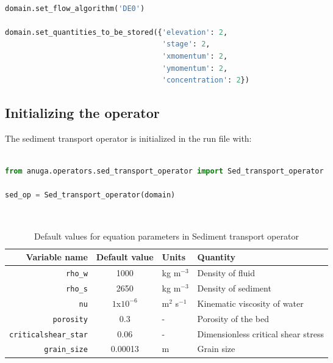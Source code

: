 \documentclass[10pt]{article}
\newcommand{\ra}[1]{\renewcommand{\arraystretch}{#1}}
\begin{document}
\begin{minipage}[c]{0.95\textwidth}
\begin{lstlisting}[language=Python, title=Setting the flow algorithm and recording the output]

domain.set_flow_algorithm('DE0')

domain.set_quantities_to_be_stored({'elevation': 2,
                                    'stage': 2,
                                    'xmomentum': 2,
                                    'ymomentum': 2,
                                    'concentration': 2})

\end{lstlisting}
\end{minipage}

\subsection{Initializing the operator}

The sediment transport operator is initialized in the run file with:

\begin{minipage}[c]{0.95\textwidth}
\begin{lstlisting}[language=Python, title=Initializing the sediment transport operator]
 
from anuga.operators.sed_transport_operator import Sed_transport_operator

sed_op = Sed_transport_operator(domain)

\end{lstlisting}
\end{minipage}
\ \\

\begin{table}[h]
\centering
\ra{1.3}
\begin{tabular}{@{}rcll@{}}
\toprule
Variable name & Default value & Units & Quantity  \\ \midrule
\verb!rho_w! & 1000 & kg m$^{-3}$ & Density of fluid  \\
\verb!rho_s! & 2650 & kg m$^{-3}$ & Density of sediment \\
\verb!nu!         &  $1$x${10}^{-6}$    &   m$^2$ s$^{-1}$          &   Kinematic viscosity of water       \\
\verb!porosity!         &   0.3   &     -        & Porosity of the bed  \\
\verb!criticalshear_star!         &   0.06   &     -        & Dimensionless critical shear stress    \\
\verb!grain_size!         &   0.00013   &     m        & Grain size       \\
\bottomrule
\end{tabular}
\caption{Default values for equation parameters in Sediment transport operator}
\label{table:sed_transport_parameters}
\end{table}
\end{document}
